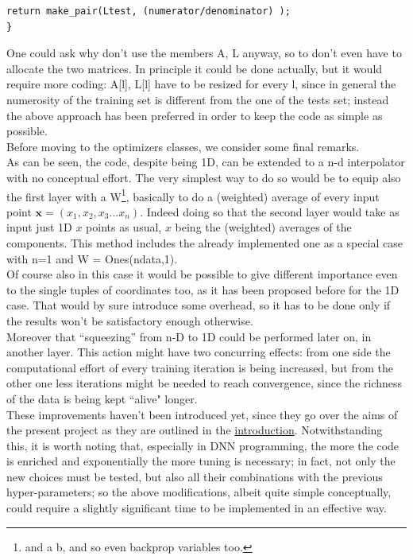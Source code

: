 \documentclass[12pt, a4paper]{report}
\theoremstyle{definition}
\begin{document}
{\begin{lstlisting}[frame=single]
	return make_pair(Ltest, (numerator/denominator) );
}
\end{lstlisting}
One could ask why don't use the members {\ttfamily A, L} anyway, so to don't even have to allocate the two matrices. In principle it could be done actually, but it would require more coding: {\ttfamily A[l], L[l]} have to be resized for every {\ttfamily l}, since in general the numerosity of the training set is different from the one of the tests set; instead the above approach has been preferred in order to keep the code as simple as possible.\\
\newpage\noindent Before moving to the optimizers classes, we consider some final remarks.\\
As can be seen, the code, despite being 1D, can be extended to a n-d interpolator with no conceptual effort. The very simplest way to do so would be to equip also the first layer with a {\ttfamily W}\footnote{and a {\ttfamily b}, and so even backprop variables too.}, basically to do a (weighted) average of every input point $\bm x = (x_1,x_2,x_3...x_n)$. Indeed doing so that the second layer would take as input just 1D $x$ points as usual, $x$ being the (weighted) averages of the components. This method includes the already implemented one as a special case with n=1 and {\ttfamily W = Ones(ndata,1)}.\\
Of course also in this case it would be possible to give different importance even to the single tuples of coordinates too, as it has been proposed before for the 1D case. That would by sure introduce some overhead, so it has to be done only if the results won't be satisfactory enough otherwise.\\
Moreover that ``squeezing'' from n-D to 1D could be performed later on, in another layer. This action might have two concurring effects: from one side the computational effort of every training iteration is being increased, but from the other one less iterations might be needed to reach convergence, since the richness of the data is being kept ``alive" longer.\\
These improvements haven't been introduced yet, since they go over the aims of the present project as they are outlined in the \hyperref[introduction]{introduction}. Notwithstanding this, it is worth noting that, especially in DNN programming, the more the code is enriched and exponentially the more tuning is necessary; in fact, not only the new choices must be tested, but also all their combinations with the previous hyper-parameters; so the above modifications, albeit quite simple conceptually, could require a slightly significant time to be implemented in an effective way.

}
\end{document}
